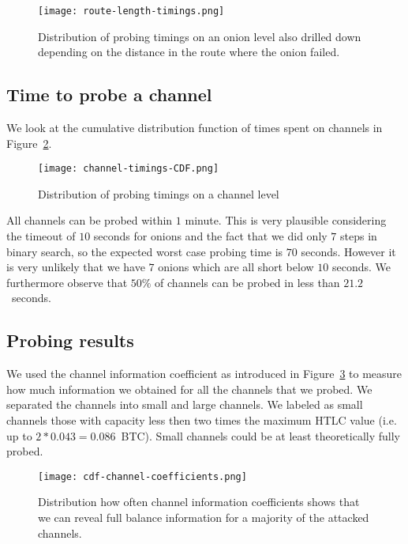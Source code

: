 \begin{figure}[]
	\centering
	\texttt{[image: route-length-timings.png]}
	\caption{Distribution of probing timings on an onion level also drilled down depending on the distance in the route where the onion failed.}
	\label{fig:route-length-timings}
\end{figure}




\subsection{Time to probe a channel}

We look at the cumulative distribution function of times spent on channels in Figure~\ref{fig:channel-timings-CDF}.

\begin{figure}[]
	\centering
	\texttt{[image: channel-timings-CDF.png]}
	\caption{Distribution of probing timings on a channel level}
	\label{fig:channel-timings-CDF}
\end{figure}

All channels can be probed within $1$ minute.
This is very plausible considering the timeout of $10$ seconds for onions and the fact that we did only $7$ steps in binary search, so the expected worst case probing time is $70$ seconds.
However it is very unlikely that we have $7$ onions which are all short below $10$ seconds.
We furthermore observe that $50\%$ of channels can be probed in less than $21.2$~seconds.%

\subsection{Probing results}

We used the channel information coefficient as introduced in Figure~\ref{fig:cdf-channel-coefficients} to measure how much information we obtained for all the channels that we probed.
We separated the channels into small and large channels.
We labeled as small channels those with capacity less then two times the maximum HTLC value (i.e. up to $2*0.043=0.086$~BTC). Small channels could be at least theoretically fully probed.

\begin{figure}[]
	\centering
	\texttt{[image: cdf-channel-coefficients.png]}
	\caption{Distribution how often channel information coefficients shows that we can reveal full balance information for a majority of the attacked channels.}
	\label{fig:cdf-channel-coefficients}
\end{figure}

